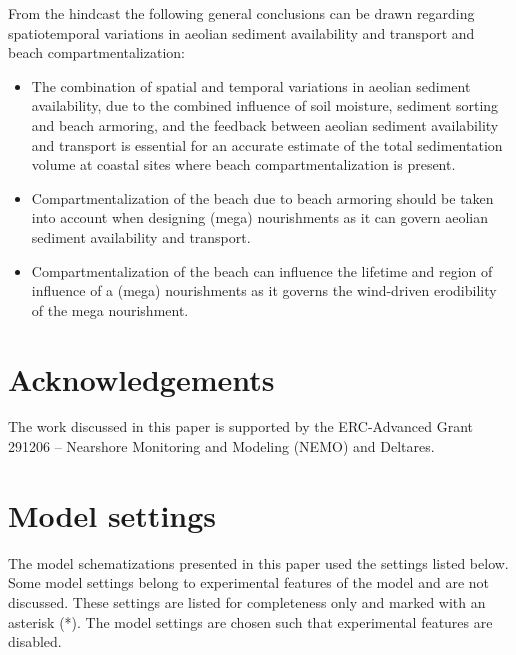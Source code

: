 \documentclass[preprint,12pt,authoryear]{elsarticle}
\begin{document}
\noindent From the hindcast the following general conclusions can be
drawn regarding spatiotemporal variations in aeolian sediment
availability and transport and beach compartmentalization:

\begin{itemize}
\item The combination of spatial and temporal variations in aeolian
  sediment availability, due to the combined influence of soil
  moisture, sediment sorting and beach armoring, and the feedback
  between aeolian sediment availability and transport is essential for
  an accurate estimate of the total sedimentation volume at coastal
  sites where beach compartmentalization is present.
\item Compartmentalization of the beach due to beach armoring should
  be taken into account when designing (mega) nourishments as it
  can govern aeolian sediment availability and transport.
\item Compartmentalization of the beach can influence the lifetime and
  region of influence of a (mega) nourishments as it governs the
  wind-driven erodibility of the mega nourishment.
\end{itemize}

\section*{Acknowledgements}
The work discussed in this paper is supported by the ERC-Advanced
Grant 291206 -- Nearshore Monitoring and Modeling (NEMO) and Deltares.

\appendix

\section{Model settings}
\label{apx:modelsettings}

The model schematizations presented in this paper used the settings
listed below. Some model settings belong to experimental features of
the model and are not discussed. These settings are listed for
completeness only and marked with an asterisk (*). The model settings
are chosen such that experimental features are disabled.
\end{document}
